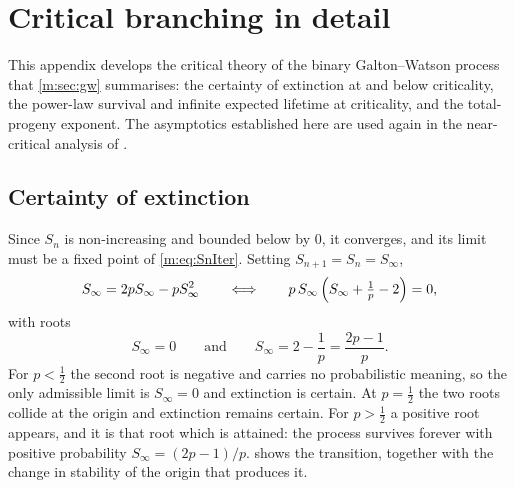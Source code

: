 \section{Critical branching in detail}
\label{m:app:critical}

This appendix develops the critical theory of the binary Galton--Watson process
that \cref{m:sec:gw} summarises: the certainty of extinction at and below
criticality, the power-law survival and infinite expected lifetime at
criticality, and the total-progeny exponent. The asymptotics established here
are used again in the near-critical analysis of \ChA.

\subsection*{Certainty of extinction}
\label{m:sec:certainty}

Since $S_n$ is non-increasing and bounded below by $0$, it converges, and its
limit must be a fixed point of \cref{m:eq:SnIter}. Setting
$S_{n+1}=S_n=S_\infty$,
\begin{equation*}
S_\infty = 2pS_\infty - pS_\infty^2
\qquad\Longleftrightarrow\qquad
p\,S_\infty\left(S_\infty + \tfrac1p - 2\right) = 0 ,
\end{equation*}
with roots
\begin{equation*}
S_\infty = 0
\qquad\text{and}\qquad
S_\infty = 2-\frac1p = \frac{2p-1}{p} .
\end{equation*}
For $p<\tfrac12$ the second root is negative and carries no probabilistic meaning,
so the only admissible limit is $S_\infty=0$ and extinction is certain. At
$p=\tfrac12$ the two roots collide at the origin and extinction remains certain.
For $p>\tfrac12$ a positive root appears, and it is that root which is attained:
the process survives forever with positive probability
$S_\infty = (2p-1)/p$.  shows the transition, together
with the change in stability of the origin that produces it.

